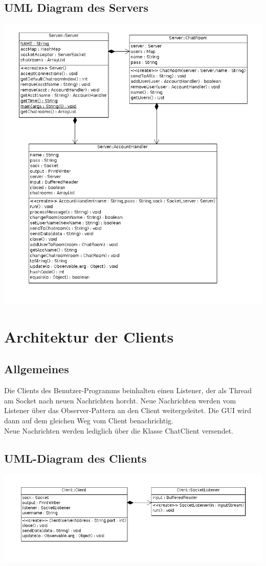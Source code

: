 \documentclass[a4paper, oneside]{scrreprt}
\begin{document}
\section{UML Diagram des Servers}

\includegraphics[scale=0.6]{data/RNPA2Server.png}


\chapter{Architektur der Clients}

\section{Allgemeines}

Die Clients des Benutzer-Programms beinhalten einen Listener, der als Thread am Socket nach neuen Nachrichten horcht. Neue Nachrichten werden vom Listener über das Observer-Pattern an den Client weitergeleitet. Die GUI wird dann auf dem gleichen Weg vom Client benachrichtig.\\
Neue Nachrichten werden lediglich über die Klasse ChatClient versendet.

\section{UML-Diagram des Clients}

\includegraphics[scale=0.6]{data/RNPA2Client.png}
\end{document}
